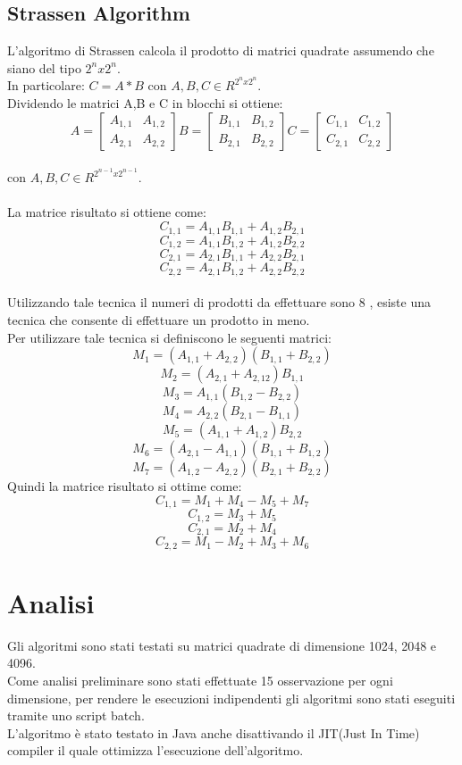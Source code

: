 \subsection{Strassen Algorithm}
L'algoritmo di Strassen calcola il prodotto di matrici quadrate assumendo che siano
del tipo $2^n x 2^n$. \\ In particolare: $ C=A*B$ con $A,B,C \in R^{2^n x 2^n}$.\\
Dividendo le matrici A,B e C in blocchi si ottiene:
\\
\[
A =
\begin{bmatrix}
  A_{1,1} & A_{1,2} \\
  A_{2,1} & A_{2,2}
\end{bmatrix}
B =
\begin{bmatrix}
  B_{1,1} & B_{1,2} \\
  B_{2,1} & B_{2,2}
\end{bmatrix}
C =
\begin{bmatrix}
  C_{1,1} & C_{1,2} \\
  C_{2,1} & C_{2,2}
\end{bmatrix}
\]\\
con $A, B, C \in R^{2^{n-1} x 2^{n-1}}$.\\
\\
La matrice risultato si ottiene come:\\
$$C_{1,1} = A_{1,1}B_{1,1}+A_{1,2}B_{2,1}$$
$$C_{1,2} = A_{1,1}B_{1,2}+A_{1,2}B_{2,2}$$
$$C_{2,1} = A_{2,1}B_{1,1}+A_{2,2}B_{2,1}$$
$$C_{2,2} = A_{2,1}B_{1,2}+A_{2,2}B_{2,2}$$
\\
Utilizzando tale tecnica il numeri di prodotti da effettuare sono 8 , esiste
una tecnica che consente di effettuare un prodotto in meno.\\
Per utilizzare tale tecnica si definiscono le seguenti matrici:\\
$$M_1 = (A_{1,1}+A_{2,2})(B_{1,1}+B_{2,2})$$
$$M_2 = (A_{2,1}+A_{2,12})B_{1,1}$$
$$M_3 = A_{1,1}(B_{1,2}-B_{2,2})$$
$$M_4 = A_{2,2}(B_{2,1}-B_{1,1})$$
$$M_5 = (A_{1,1}+A_{1,2})B_{2,2}$$
$$M_6 = (A_{2,1}-A_{1,1})(B_{1,1}+B_{1,2})$$
$$M_7 = (A_{1,2}-A_{2,2})(B_{2,1}+B_{2,2})$$
Quindi la matrice risultato si ottime come:
$$C_{1,1} = M_1 + M_4 - M_5 + M_7$$
$$C_{1,2} = M_3 + M_5$$
$$C_{2,1} = M_2 + M_4$$
$$C_{2,2} = M_1 - M_2 + M_3 + M_6$$

\section{Analisi}

Gli algoritmi sono stati testati su matrici quadrate di dimensione 1024, 2048 e 4096.\\
Come analisi preliminare sono stati effettuate 15 osservazione per ogni dimensione,
per rendere le esecuzioni indipendenti gli algoritmi sono stati eseguiti tramite uno
script batch.\\
L'algoritmo è stato testato in Java anche disattivando il JIT(Just In Time)
compiler il quale ottimizza l'esecuzione dell'algoritmo.\\

